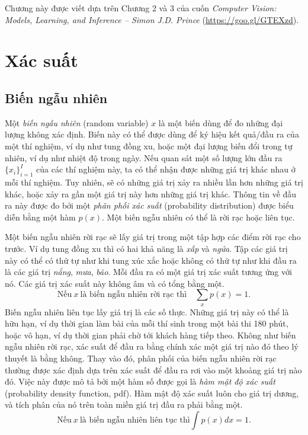 {Chương này được viết dựa trên Chương 2 và 3 của cuốn \textit{Computer Vision:  Models, Learning, and Inference -- Simon J.D. Prince} (\url{https://goo.gl/GTEXzd}).}

\section{Xác suất}


\subsection{Biến ngẫu nhiên}

Một \textit{biến ngẫu nhiên} (random variable) $x$ là một biến dùng để đo những đại lượng không
xác định. Biến này có thể được dùng để ký hiệu kết quả/đầu ra của một thí
nghiệm, ví dụ như tung đồng xu, hoặc một đại lượng biến đổi trong tự nhiên, ví
dụ như nhiệt độ trong ngày. Nếu quan sát một số lượng lớn đầu ra
$\{x_i\}_{i=1}^I$ của các thí nghiệm này, ta có thể nhận được những giá trị khác
nhau ở mỗi thí nghiệm. Tuy nhiên, sẽ có những giá trị xảy ra nhiều lần hơn những
giá trị khác, hoặc xảy ra gần một giá trị này hơn những giá trị khác. Thông tin
về đầu ra này được đo bởi một \textit{phân phối xác suất} (probability distribution) được biểu diễn bằng
một hàm $p(x)$. Một biến ngẫu nhiên có thể là {rời rạc} hoặc {liên
tục}.

Một biến ngẫu nhiên rời rạc sẽ lấy giá trị trong một tập hợp các điểm rời rạc
cho trước. Ví dụ tung đồng xu thì có hai khả năng là \textit{xấp} và
\textit{ngửa}. Tập các giá trị này có thể có thứ tự như khi tung xúc xắc hoặc
không có thứ tự như khi đầu ra là các giá trị \textit{nắng}, \textit{mưa},
\textit{bão}. Mỗi đầu ra có một giá trị xác suất tương ứng với nó. Các giá trị
xác suất này không âm và có tổng bằng một.
\begin{equation}
\label{eqn:30_1}
\text{Nếu}~ x ~\text{là biến ngẫu nhiên rời rạc thì}\quad \sum_{x} p(x) = 1.
\end{equation}
Biến ngẫu nhiên liên tục lấy giá trị là các số thực. Những giá trị này có thể là
hữu hạn, ví dụ thời gian làm bài của mỗi thí sinh trong một bài thi 180 phút,
hoặc vô hạn, ví dụ thời gian phải chờ tới khách hàng tiếp theo. Không như biến
ngẫu nhiên rời rạc, xác suất để đầu ra bằng {chính xác} một giá trị nào đó theo
lý thuyết là bằng không. Thay vào đó, phân phối của biến ngẫu nhiên rời rạc
thường được xác định dựa trên xác suất để đầu ra rơi vào một khoảng giá trị nào
đó. Việc này được mô tả bởi một hàm số được gọi là \textit{hàm mật độ xác suất} (probability density function, pdf). Hàm mật độ xác suất
luôn cho giá trị dương, và tích phân của nó trên toàn miền giá trị đầu ra phải
bằng một.
\begin{equation}
\label{eqn:30_2_a}
\text{Nếu}~ x ~\text{là biến ngẫu nhiên liên tục thì} \int p(x)dx = 1.
\end{equation}

